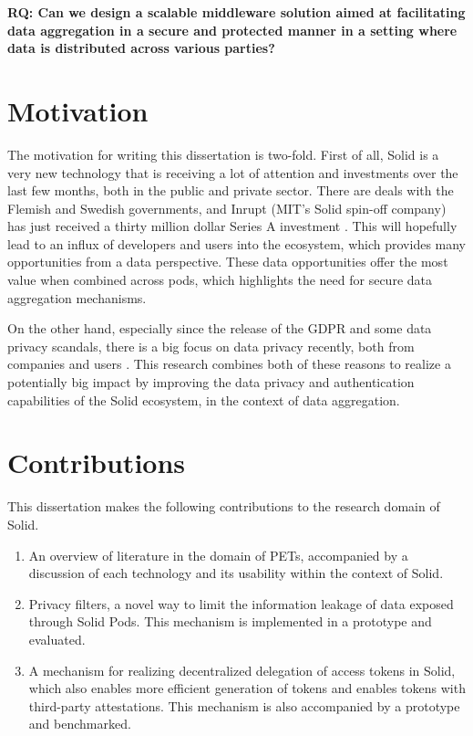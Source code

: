 \noindent \textbf{RQ: Can we design a scalable middleware solution aimed at facilitating data aggregation in a secure and protected manner in a setting where data is distributed across various parties?
}

\section{Motivation}
\label{sec:motivation}
The motivation for writing this dissertation is two-fold. First of all, Solid is a very new technology that is receiving a lot of attention and investments over the last few months, both in the public and private sector. There are deals with the Flemish  and Swedish  governments, and Inrupt (MIT's Solid spin-off company) has just received a thirty million dollar Series A investment . This will hopefully lead to an influx of developers and users into the ecosystem, which provides many opportunities from a data perspective. These data opportunities offer the most value when combined across pods, which highlights the need for secure data aggregation mechanisms.

On the other hand, especially since the release of the GDPR and some data privacy scandals, there is a big focus on data privacy recently, both from companies and users . This research combines both of these reasons to realize a potentially big impact by improving the data privacy and authentication capabilities of the Solid  ecosystem, in the context of data aggregation. 

\section{Contributions}
\label{sec:contributions}
This dissertation makes the following contributions to the research domain of Solid.
\begin{enumerate}
    \item An overview of literature in the domain of \acrlong{PETs}, accompanied by a discussion of each technology and its usability within the context of Solid.
    \item Privacy filters, a novel way to limit the information leakage of data exposed through Solid Pods. This mechanism is implemented in a prototype and evaluated.
    \item A mechanism for realizing decentralized delegation of access tokens in Solid, which also enables more efficient generation of tokens and enables tokens with third-party attestations. This mechanism is also accompanied by a prototype and benchmarked.
\end{enumerate}

